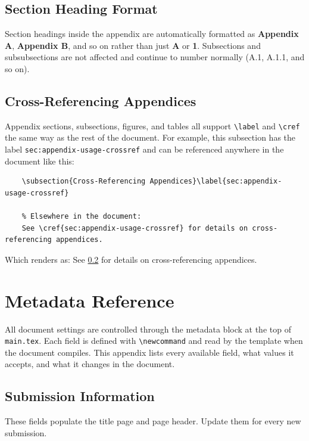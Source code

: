 \subsection{Section Heading Format}
Section headings inside the appendix are automatically formatted as \textbf{Appendix A}, \textbf{Appendix B}, and so on rather than just \textbf{A} or \textbf{1}. Subsections and subsubsections are not affected and continue to number normally (A.1, A.1.1, and so on).

\subsection{Cross-Referencing Appendices}\label{sec:appendix-usage-crossref}
Appendix sections, subsections, figures, and tables all support \texttt{\textbackslash label} and \texttt{\textbackslash cref} the same way as the rest of the document. For example, this subsection has the label \texttt{sec:appendix-usage-crossref} and can be referenced anywhere in the document like this:

\begin{lstlisting}[style=latex,
	caption={Appendix Section Cross-Reference.}]
	% In the appendix:
	\subsection{Cross-Referencing Appendices}\label{sec:appendix-usage-crossref}
	
	% Elsewhere in the document:
	See \cref{sec:appendix-usage-crossref} for details on cross-referencing appendices.
\end{lstlisting}

Which renders as: See \cref{sec:appendix-usage-crossref} for details on cross-referencing appendices.

\newpage
\section{Metadata Reference}

All document settings are controlled through the metadata block at the top of \texttt{main.tex}. Each field is defined with \texttt{\textbackslash newcommand} and read by the template when the document compiles. This appendix lists every available field, what values it accepts, and what it changes in the document.

\subsection{Submission Information}
These fields populate the title page and page header. Update them for every new submission.

